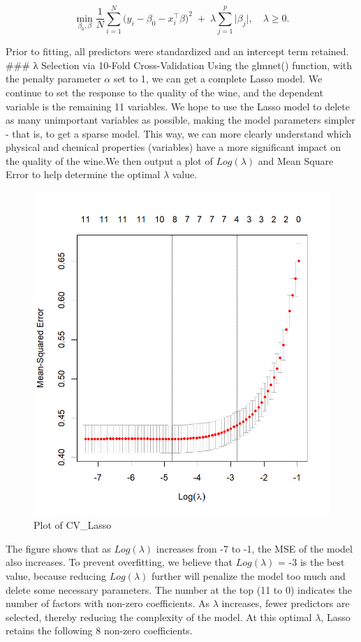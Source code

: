 \documentclass[
  doc,floatsintext]{apa6}
\begin{document}
\begin{equation}
\label{eq:lasso}
\min_{\beta_0,\beta}
  \frac{1}{N}\sum_{i=1}^N \bigl(y_i - \beta_0 - x_i^\top \beta\bigr)^2
  \;+\;
  \lambda \sum_{j=1}^p \lvert \beta_j\rvert,
\quad
\lambda \ge 0.
\end{equation}

Prior to fitting, all predictors were standardized and an intercept term retained.
\#\#\# λ Selection via 10-Fold Cross-Validation
Using the glmnet() function, with the penalty parameter \(α\) set to 1, we can get a complete Lasso model. We continue to set the response to the quality of the wine, and the dependent variable is the remaining 11 variables. We hope to use the Lasso model to delete as many unimportant variables as possible, making the model parameters simpler - that is, to get a sparse model. This way, we can more clearly understand which physical and chemical properties (variables) have a more significant impact on the quality of the wine.We then output a plot of \(Log(λ)\) and Mean Square Error to help determine the optimal \(λ\) value.

\begin{figure}[H]

{\centering \includegraphics[width=0.5\linewidth]{../plots/cv_lasso} 

}

\caption{Plot of CV\_Lasso}\label{fig:fig-cv-lasso}
\end{figure}

The figure shows that as \(Log(λ)\) increases from -7 to -1, the MSE of the model also increases. To prevent overfitting, we believe that \(Log(λ)\) = -3 is the best value, because reducing \(Log(λ)\) further will penalize the model too much and delete some necessary parameters. The number at the top (11 to 0) indicates the number of factors with non-zero coefficients. As \(λ\) increases, fewer predictors are selected, thereby reducing the complexity of the model. At this optimal \(λ\), Lasso retains the following 8 non-zero coefficients.
\end{document}
